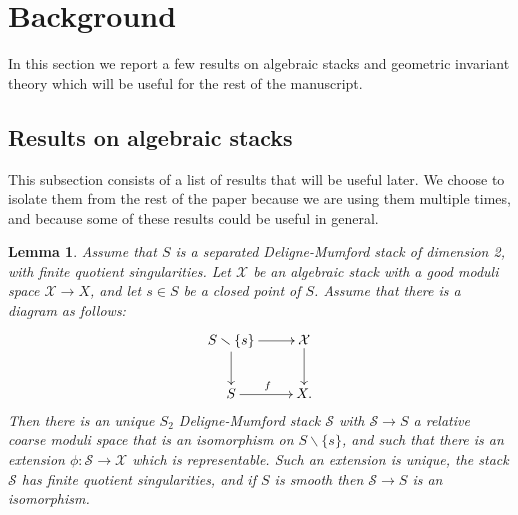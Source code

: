 \documentclass{amsart}
\newcommand{\cS}{\mathcal{S}}
\newcommand{\cX}{\mathcal{X}}
\newcommand{\spec}{\operatorname{Spec}}
\newcommand{\Aut}{\operatorname{Aut}}
\newtheorem{Lemma}[theorem]{Lemma}
\theoremstyle{definition}
\theoremstyle{definition}
\begin{document}
{ \section{Background}\label{section_background}
In this section we report a few results on algebraic stacks and geometric invariant theory which will be useful for the rest of the manuscript.
 \subsection{Results on algebraic stacks}\label{subsection_algebraic_stacks}
This subsection consists of a list of results that will be useful later. We choose to isolate them from the rest of the paper because we are using them multiple times, and because some of these results could be useful in general. 

\begin{Lemma}\label{lemma_generalization_purity_tsm1}
    Assume that $S$ is a separated Deligne-Mumford stack of dimension 2, with finite quotient singularities. Let $\cX$ be an algebraic stack with a good moduli space $\cX\to X$, and let $s\in S$ be a closed point of $S$. Assume that there is a diagram as follows:
    \[
    \xymatrix{S\smallsetminus\{s\}\ar[d]\ar[r] & \cX\ar[d]\\S\ar[r]^f & X.}
    \]
    {Then there is an unique $S_2$ Deligne-Mumford stack $\cS$ with $\cS\to S$ a relative coarse moduli space that is an isomorphism on $S\smallsetminus \{s\}$, and such that there is an extension $\phi:\cS\to \cX$ which is representable. Such an extension is unique, the stack $\cS$ has finite quotient singularities, and if $S$ is smooth then $\cS\to S$ is an isomorphism.}  
\end{Lemma}

}
\end{document}
